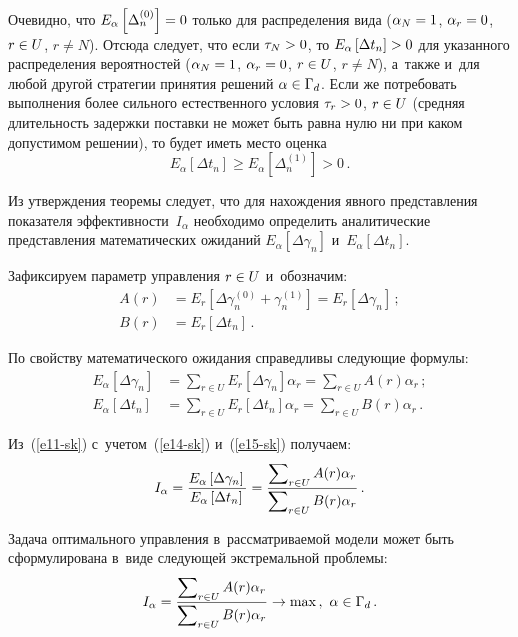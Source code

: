 \begin{multicols}{2}
  Очевидно, что $E_\alpha\left[ \Delta_n^{(0)}\right]\hm=0$ только для 
распределения вида ($\alpha_N\hm=1$, $\alpha_r\hm= 0$, $r\hm\in U$, $r\not= 
N$). Отсюда следует, что если $\tau_N\hm>0$, то $E_\alpha\left[ \Delta t_n\right] 
\hm>0$ для указанного распределения вероятностей ($\alpha_N\hm=1$, 
$\alpha_r\hm=0$, $r\hm\in U$, $r\not= N$), а~также и~для любой другой 
стратегии принятия решений $\alpha\hm\in \Gamma_d$. Если же потребовать 
выполнения более сильного естественного условия $\tau_r\hm>0$, $r\hm\in U$ 
(средняя дли\-тель\-ность задержки по\-став\-ки не может быть равна нулю ни при 
каком допустимом решении), то будет иметь мес\-то оценка 
$$
E_\alpha \left[ \Delta  t_n\right]\geq E_\alpha \left[ \Delta_n^{(1)}\right] >0\,.
$$
  
  Из утверждения тео\-ре\-мы следует, что для нахождения явного пред\-став\-ле\-ния 
показателя эффективности~$I_\alpha$ необходимо определить аналитические 
пред\-став\-ле\-ния математических ожиданий $E_\alpha\left[ \Delta\gamma_n\right]$ 
и~$E_\alpha\left[ \Delta t_n\right]$.
  
  Зафиксируем параметр управ\-ле\-ния $r\hm\in U$ и~обозначим:
  \begin{align}
  A(r)&= E_r \left[ \Delta \gamma_n^{(0)} +\gamma_n^{(1)}\right] = E_r \left[ 
\Delta \gamma_n\right]\,;\label{e12-sk}\\
B(r)&=E_r\left[ \Delta t_n\right]\label{e13-sk}\,.
\end{align}
  
  По свойству математического ожидания справедливы сле\-ду\-ющие формулы:
  \begin{align}
  E_\alpha \left[ \Delta \gamma_n\right] &= \sum\limits_{r\in U} E_r \left[ 
\Delta\gamma_n\right]\alpha_r=\sum\limits_{r\in U} A(r)\alpha_r\,;\label{e14-sk}
\\
  E_\alpha \left[ \Delta t_n\right] &= \sum\limits_{r\in U} E_r \left[ \Delta 
t_n\right]\alpha_r=\sum\limits_{r\in U} B(r)\alpha_r\,.\label{e15-sk}
  \end{align}
  
  Из~(\ref{e11-sk}) с~учетом~(\ref{e14-sk}) и~(\ref{e15-sk}) получаем:
  \begin{equation}
  I_\alpha= \displaystyle\frac{\displaystyle E_\alpha\left[ \Delta\gamma_n\right] \mathstrut}{\displaystyle E_\alpha\left[ \Delta 
t_n\right] \mathstrut}=\displaystyle\frac{\displaystyle \sum\nolimits_{r\in U} A(r)\alpha_r\mathstrut}{\displaystyle \sum\nolimits_{r\in U} B(r) 
\alpha_r\mathstrut}\,.
  \label{e16-sk}
  \end{equation}
  
  Задача оптимального управ\-ле\-ния в~рассматриваемой модели может быть 
сформулирована в~виде сле\-ду\-ющей экстремальной проб\-лемы:
  \begin{equation}
  I_\alpha= \displaystyle\frac{\displaystyle \sum\nolimits_{r\in U}  A(r)\alpha_r\mathstrut}{\displaystyle \sum\nolimits_{r\in U} 
B(r)\alpha_r\mathstrut}\to \max\,,\ \alpha\in \Gamma_d\,.
  \label{e17-sk}
  \end{equation}
  

\end{multicols}

